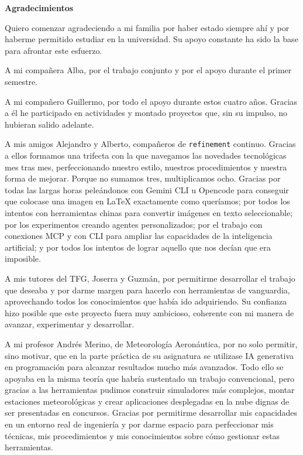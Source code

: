 \clearpage
\thispagestyle{empty}

\begin{flushright}
  {\fontsize{28pt}{28pt}\selectfont\bfseries Agradecimientos\par}
\end{flushright}

\vspace{0.3cm}

\begingroup
{}\textwidth
\parindent=0pt
\fontsize{10pt}{12.5pt}\itshape\selectfont

Quiero comenzar agradeciendo a mi familia por haber estado siempre ahí y por
haberme permitido estudiar en la universidad. Su apoyo constante ha sido la base
para afrontar este esfuerzo. 

A mi compañera Alba, por el trabajo conjunto y por el apoyo durante el primer
semestre.

A mi compañero Guillermo, por todo el apoyo durante estos cuatro años. Gracias a
él he participado en actividades y montado proyectos que, sin su impulso, no hubieran
salido adelante.

A mis amigos Alejandro y Alberto, compañeros de \texttt{refinement} continuo. Gracias
a ellos formamos una trifecta con la que navegamos las novedades tecnológicas mes tras
mes, perfeccionando nuestro estilo, nuestros procedimientos y nuestra forma de mejorar.
Porque no sumamos tres, multiplicamos ocho. Gracias por todas las largas horas
peleándonos con Gemini CLI u Opencode para conseguir que colocase una imagen en
LaTeX exactamente como queríamos; por todos los intentos con herramientas chinas
para convertir imágenes en texto seleccionable; por los experimentos creando
agentes personalizados; por el trabajo con conexiones MCP y con CLI para ampliar las
capacidades de la inteligencia artificial; y por todos los intentos de lograr aquello que
nos decían que era imposible.

A mis tutores del TFG, Joserra y Guzmán, por permitirme desarrollar el trabajo
que deseaba y por darme margen para hacerlo con herramientas de vanguardia,
aprovechando todos los conocimientos que había ido adquiriendo. Su confianza
hizo posible que este proyecto fuera muy ambicioso, coherente con mi manera de
avanzar, experimentar y desarrollar. 

A mi profesor Andrés Merino, de Meteorología Aeronáutica, por no solo permitir,
sino motivar, que en la parte práctica de su asignatura se utilizase IA generativa
en programación para alcanzar resultados mucho más avanzados. Todo ello se apoyaba en
la misma teoría que habría sustentado un trabajo convencional, pero gracias a
las herramientas pudimos construir simuladores más complejos, montar estaciones
meteorológicas y crear aplicaciones desplegadas en la nube dignas de ser presentadas
en concursos. Gracias por permitirme desarrollar mis capacidades en un entorno
real de ingeniería y por darme espacio para perfeccionar mis técnicas, mis
procedimientos y mis conocimientos sobre cómo gestionar estas herramientas.

